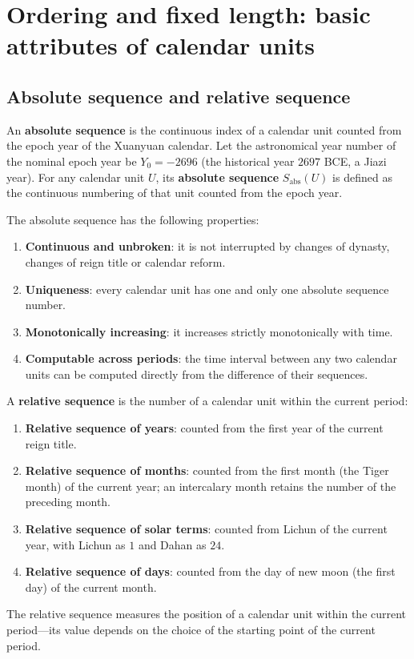 \section{Ordering and fixed length: basic attributes of calendar units}
\label{sec:calendar_sequence_length}

\subsection{Absolute sequence and relative sequence}

\begin{definition}\label{def:absolute_sequence}
An \textbf{absolute sequence} is the continuous index of a calendar unit counted from the epoch year of the Xuanyuan calendar. Let the astronomical year number of the nominal epoch year be \(Y_0=-2696\) (the historical year \(2697\) BCE, a Jiazi year). For any calendar unit \(U\), its \textbf{absolute sequence} \(S_{\text{abs}}(U)\) is defined as the continuous numbering of that unit counted from the epoch year.

The absolute sequence has the following properties:
\begin{enumerate}[label=(\roman*)]
    \item \textbf{Continuous and unbroken}: it is not interrupted by changes of dynasty, changes of reign title or calendar reform.
    \item \textbf{Uniqueness}: every calendar unit has one and only one absolute sequence number.
    \item \textbf{Monotonically increasing}: it increases strictly monotonically with time.
    \item \textbf{Computable across periods}: the time interval between any two calendar units can be computed directly from the difference of their sequences.
\end{enumerate}
\end{definition}

\begin{definition}\label{def:relative_sequence}
A \textbf{relative sequence} is the number of a calendar unit within the current period:
\begin{enumerate}[label=(\roman*)]
    \item \textbf{Relative sequence of years}: counted from the first year of the current reign title.
    \item \textbf{Relative sequence of months}: counted from the first month (the Tiger month) of the current year; an intercalary month retains the number of the preceding month.
    \item \textbf{Relative sequence of solar terms}: counted from Lichun of the current year, with Lichun as \(1\) and Dahan as \(24\).
    \item \textbf{Relative sequence of days}: counted from the day of new moon (the first day) of the current month.
\end{enumerate}
The relative sequence measures the position of a calendar unit within the current period---its value depends on the choice of the starting point of the current period.
\end{definition}

